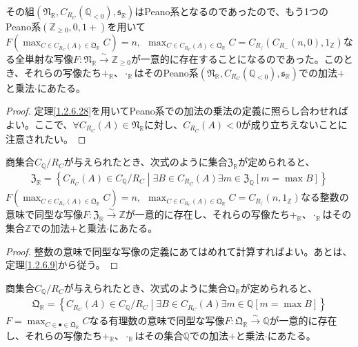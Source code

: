 \documentclass[dvipdfmx]{jsarticle}
\begin{document}
\begin{thm}\label{1.2.6.30}
その組$\left( \mathfrak{N}_{\mathbb{R}},C_{R_{C}}\left( \mathbb{Q}_{< 0} \right),\mathfrak{s}_{\mathbb{R}} \right)$はPeano系となるのであったので、もう1つのPeano系$\left( \mathbb{Z}_{\geq 0},0,1 + \right)$を用いて$F\left( \max_{C \in C_{R_{C}}(A) \in \mathfrak{Q}_{\mathbb{R}}}C \right) = n,\ \ \max_{C \in C_{R_{C}}(A) \in \mathfrak{Q}_{\mathbb{R}}}C = C_{R_{/}}\left( C_{R_{-}}(n,0),1_{\mathbb{Z}} \right)$なる全単射な写像$F:\mathfrak{N}_{\mathbb{R}}\overset{\sim}{\rightarrow}\mathbb{Z}_{\geq 0}$が一意的に存在することになるのであった。このとき、それらの写像たち$+_{\mathbb{R}}$、$\cdot_{\mathbb{R}}$はそのPeano系$\left( \mathfrak{N}_{\mathbb{R}},C_{R_{C}}\left( \mathbb{Q}_{< 0} \right),\mathfrak{s}_{\mathbb{R}} \right)$での加法$+$と乗法$\cdot$にあたる。
\end{thm}
\begin{proof}
定理\ref{1.2.6.28}を用いてPeano系での加法の乗法の定義に照らし合わせればよい。ここで、$\forall C_{R_{C}}(A) \in \mathfrak{N}_{\mathbb{R}}$に対し、$C_{R_{C}}(A) < 0$が成り立ちえないことに注意されたい。
\end{proof}
\begin{thm}\label{1.2.6.31}
商集合$C_{\mathbb{Q}} /R_{C} $が与えられたとき、次式のように集合$\mathfrak{Z}_{\mathbb{R}}$が定められると、
\begin{align*}
\mathfrak{Z}_{\mathbb{R}} = \left\{ C_{R_{C}}(A) \in C_{\mathbb{Q}} /R_{C}  \middle| \exists B \in C_{R_{C}}(A)\exists m \in \mathfrak{Z}_{\mathbb{Q}}\left[ m = \max B \right] \right\}
\end{align*}
$F\left( \max_{C \in C_{R_{C}}(A) \in \mathfrak{Q}_{\mathbb{R}}}C \right) = n,\ \ \max_{C \in C_{R_{C}}(A) \in \mathfrak{Q}_{\mathbb{R}}}C = C_{R_{/}}\left( n,1_{\mathbb{Z}} \right)$なる整数の意味で同型な写像$F:\mathfrak{Z}_{\mathbb{R}}\overset{\sim}{\rightarrow}\mathbb{Z}$が一意的に存在し、それらの写像たち$+_{\mathbb{R}}$、$\cdot_{\mathbb{R}}$はその集合$\mathbb{Z}$での加法$+$と乗法$\cdot$にあたる。
\end{thm}
\begin{proof}
整数の意味で同型な写像の定義にあてはめれて計算すればよい。あとは、定理\ref{1.2.6.9}から従う。
\end{proof}
\begin{thm}\label{1.2.6.32}
商集合$C_{\mathbb{Q}} /R_{C} $が与えられたとき、次式のように集合$\mathfrak{Q}_{\mathbb{R}}$が定められると、
\begin{align*}
\mathfrak{Q}_{\mathbb{R}} = \left\{ C_{R_{C}}(A) \in C_{\mathbb{Q}} /R_{C}  \middle| \exists B \in C_{R_{C}}(A)\exists m \in \mathbb{Q}\left[ m = \max B \right] \right\}
\end{align*}
$F = \max_{C \in \bullet \in \mathfrak{Q}_{\mathbb{R}}}C$なる有理数の意味で同型な写像$F:\mathfrak{Q}_{\mathbb{R}}\overset{\sim}{\rightarrow}\mathbb{Q}$が一意的に存在し、それらの写像たち$+_{\mathbb{R}}$、$\cdot_{\mathbb{R}}$はその集合$\mathbb{Q}$での加法$+$と乗法$\cdot$にあたる。
\end{thm}
\end{document}
